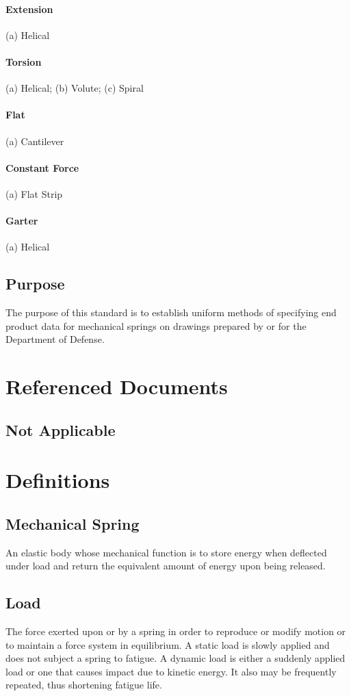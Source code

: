 \documentclass[10pt]{article}
\begin{document}
\paragraph{Extension}
(a) Helical
\paragraph{Torsion}
(a) Helical; (b) Volute; (c) Spiral
\paragraph{Flat}
(a) Cantilever
\paragraph{Constant Force}
(a) Flat Strip
\paragraph{Garter}
(a) Helical

\subsection{Purpose}
The purpose of this standard is to establish uniform methods of specifying end product data for mechanical springs on drawings prepared by or for the Department of Defense.

\section{Referenced Documents}
\subsection{Not Applicable}

\section{Definitions}
\subsection{Mechanical Spring}
An elastic body whose mechanical function is to store energy when deflected under load and return the equivalent amount of energy upon being released.
\subsection{Load}
The force exerted upon or by a spring in order to reproduce or modify motion or to maintain a force system in equilibrium.
A static load is slowly applied and does not subject a spring to fatigue.
A dynamic load is either a suddenly applied load or one that causes impact due to kinetic energy. 
It also may be frequently repeated, thus shortening fatigue life.
\end{document}
